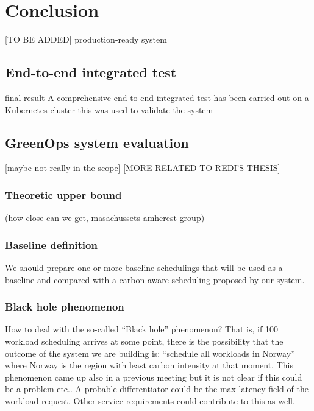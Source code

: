 \chapter{Conclusion}
\label{cha:conclusion}

[TO BE ADDED]
production-ready system

\section{End-to-end integrated test}

final result
A comprehensive end-to-end integrated test has been carried out on a Kubernetes cluster
this was used to validate the system

\section{GreenOps system evaluation}

[maybe not really in the scope]
[MORE RELATED TO REDI'S THESIS]


\subsection{Theoretic upper bound}

 (how close can we get, masachussets amherest group)

\subsection{Baseline definition}

We should prepare one or more baseline schedulings that will be used as a baseline and compared with a carbon-aware scheduling proposed by our system.

\subsection{Black hole phenomenon}

How to deal with the so-called “Black hole” phenomenon?
That is, if 100 workload scheduling arrives at some point, there is the possibility that the outcome of the system we are building is: “schedule all workloads in Norway” where Norway is the region with least carbon intensity at that moment.
This phenomenon came up also in a previous meeting but it is not clear if this could be a problem etc..
A probable differentiator could be the max latency field of the workload request. Other service requirements could contribute to this as well.


